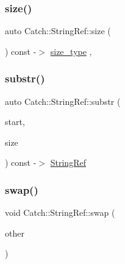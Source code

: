 \mbox{\label{class_catch_1_1_string_ref_ae084d72cb2952cee61a63ef36611d0ad}} 
\subsubsection{\texorpdfstring{size()}{size()}}
{\footnotesize\ttfamily auto Catch\+::\+String\+Ref\+::size (\begin{DoxyParamCaption}{ }\end{DoxyParamCaption}) const -\/$>$ \mbox{\hyperlink{class_catch_1_1_string_ref_a06b4db8fc82b197004291cf370b2ba7c}{size\+\_\+type}} \hspace{0.3cm}{\ttfamily [inline]}, {\ttfamily [noexcept]}}

\mbox{\label{class_catch_1_1_string_ref_a248568b467cf6599320903ae613c8eee}} 
\subsubsection{\texorpdfstring{substr()}{substr()}}
{\footnotesize\ttfamily auto Catch\+::\+String\+Ref\+::substr (\begin{DoxyParamCaption}\item[{\mbox{\hyperlink{class_catch_1_1_string_ref_a06b4db8fc82b197004291cf370b2ba7c}{size\+\_\+type}}}]{start,  }\item[{\mbox{\hyperlink{class_catch_1_1_string_ref_a06b4db8fc82b197004291cf370b2ba7c}{size\+\_\+type}}}]{size }\end{DoxyParamCaption}) const -\/$>$  \mbox{\hyperlink{class_catch_1_1_string_ref}{String\+Ref}}\hspace{0.3cm}{\ttfamily [noexcept]}}

\mbox{\label{class_catch_1_1_string_ref_a8a843e39ad3560d10a80524ed926ed63}} 
\subsubsection{\texorpdfstring{swap()}{swap()}}
{\footnotesize\ttfamily void Catch\+::\+String\+Ref\+::swap (\begin{DoxyParamCaption}\item[{\mbox{\hyperlink{class_catch_1_1_string_ref}{String\+Ref}} \&}]{other }\end{DoxyParamCaption})\hspace{0.3cm}{\ttfamily [noexcept]}}



